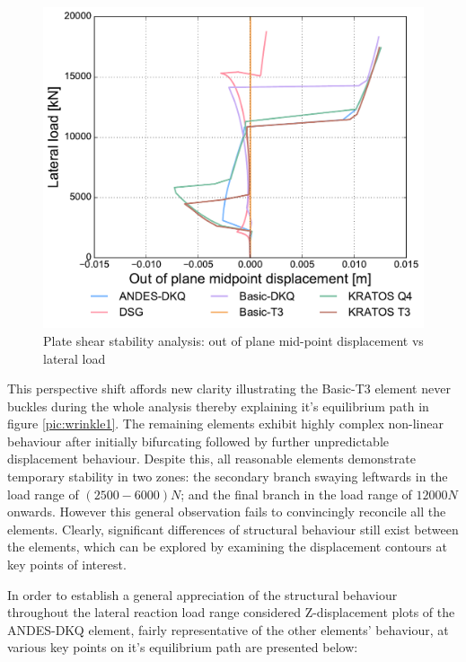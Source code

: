 \begin{figure}[H]
	\centering
	\def\svgwidth{\columnwidth}
	\includegraphics[width=12cm]{images/stability_wrinkle_pointtrans_disp.pdf}
	\caption{Plate shear stability analysis: out of plane mid-point displacement vs lateral load}
	\label{pic:wrinkle2}
\end{figure}

This perspective shift affords new clarity illustrating the Basic-T3 element never buckles during the whole analysis thereby explaining it's equilibrium path in figure \ref{pic:wrinkle1}. The remaining elements exhibit highly complex non-linear behaviour after initially bifurcating followed by further unpredictable displacement behaviour. Despite this, all reasonable elements demonstrate temporary stability in two zones: the secondary branch swaying leftwards in the load range of $(2500 - 6000)N$; and the final branch in the load range of $12000 N$ onwards. However this general observation fails to convincingly reconcile all the elements. Clearly, significant differences of structural behaviour still exist between the elements, which can be explored by examining the displacement contours at key points of interest.

In order to establish a general appreciation of the structural behaviour throughout the lateral reaction load range considered Z-displacement plots of the ANDES-DKQ element, fairly representative of the other elements' behaviour, at various key points on it's equilibrium path are presented below:

